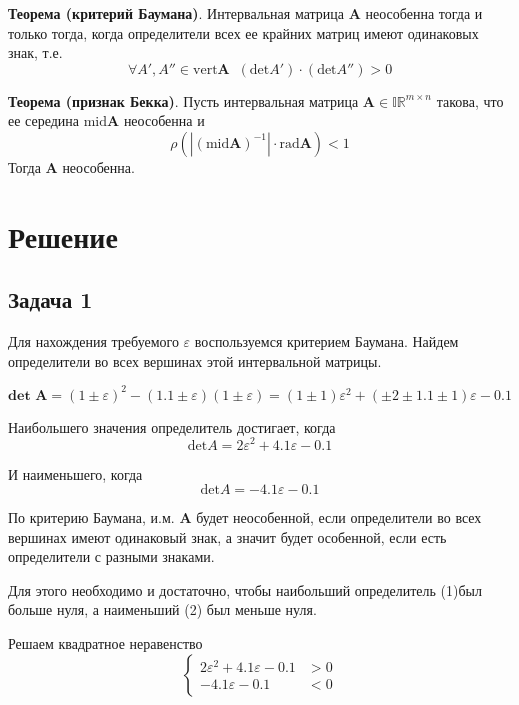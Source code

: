 \documentclass[14pt,a4paper,article]{ncc}
\begin{document}
\textbf{Теорема (критерий Баумана)}. Интервальная матрица \textbf{A} неособенна тогда и только тогда,
когда определители всех ее крайних матриц имеют одинаковых знак, т.е.
$$\forall A', A'' \in \text{vert} \textbf{A} \;\; (\text{det} A') \cdot (\text{det} A'') > 0$$


\textbf{Теорема (признак Бекка)}. Пусть интервальная матрица $\textbf{A} \in \mathbb{IR}^{m\times n}$ такова, что ее середина $\text{mid} \textbf{A}$ неособенна
и 
$$ \rho(|(\text{mid} \textbf{A})^{-1}| \cdot \text{rad} \textbf{A}) < 1 $$
Тогда \textbf{A} неособенна.


\section{Решение}
\subsection{Задача 1}
Для нахождения требуемого $\varepsilon$ воспользуемся критерием Баумана.
Найдем определители во всех вершинах этой интервальной матрицы.

$$\textbf{det A} = (1 \pm \varepsilon)^2 - (1.1 \pm \varepsilon)(1 \pm \varepsilon) = (1 \pm 1)\varepsilon^2 + (\pm 2 \pm 1.1 \pm 1)\varepsilon - 0.1$$

Наибольшего значения определитель достигает, когда 
\begin{equation}
\text{det} A = 2\varepsilon^2 + 4.1\varepsilon - 0.1    
\end{equation}

И наименьшего, когда
\begin{equation}
\text{det} A = -4.1\varepsilon - 0.1  
\end{equation}

По критерию Баумана, и.м. \textbf{A} будет неособенной, если
определители во всех вершинах имеют одинаковый знак, а значит
будет особенной, если есть определители с разными знаками.

Для этого необходимо и достаточно, чтобы наибольший определитель
(1)был больше нуля, а наименьший (2) был меньше нуля.

Решаем квадратное неравенство
\begin{equation}
 \begin{cases}
   2\varepsilon^2 + 4.1\varepsilon - 0.1 &> 0 \\
   -4.1\varepsilon - 0.1 &< 0
 \end{cases}
\end{equation}
\end{document}
